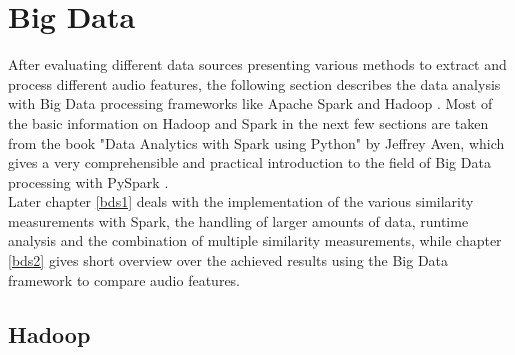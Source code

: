 
\section{Big Data}\label{bdf}

After evaluating different data sources presenting various methods to extract and process different audio features, the following section describes the data analysis with Big Data processing frameworks like Apache Spark \cite{spark} and Hadoop \cite{hadoop}. Most of the basic information on Hadoop and Spark in the next few sections are taken from the book "Data Analytics with Spark using Python" by Jeffrey Aven, which gives a very comprehensible and practical introduction to the field of Big Data processing with PySpark \cite{sparkbook1}.\\ 
Later chapter \ref{bds1} deals with the implementation of the various similarity measurements with Spark, the handling of larger amounts of data, runtime analysis and the combination of multiple similarity measurements, while chapter \ref{bds2} gives short overview over the achieved results using the Big Data framework to compare audio features. 

\subsection{Hadoop}

